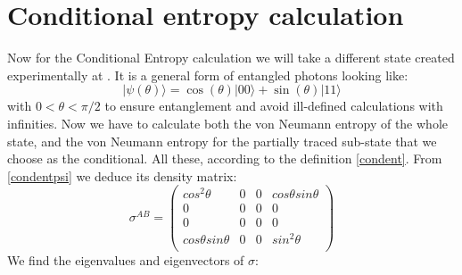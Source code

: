 \section{Conditional entropy calculation}
Now for the Conditional Entropy calculation we will take a different state created experimentally at \cite{gomez2019experimental}. It is a general form of entangled photons looking like:
\begin{equation}
|\psi(\theta)\rangle=\cos (\theta)|00\rangle+\sin (\theta)|11\rangle
\label{condentpsi}
\end{equation}
with $0< \theta< \pi /2$ to ensure entanglement and avoid ill-defined calculations with infinities.
Now we have to calculate both the von Neumann entropy of the whole state, and the von Neumann entropy for the partially traced sub-state that we choose as the conditional. All these, according to the definition \ref{condent}.
From \ref{condentpsi} we deduce its density matrix:
\begin{equation}
\sigma^{AB}=\left(
\begin{array}{cccc}
 cos ^2 \theta & 0 & 0 & cos \theta sin \theta \\
 0 & 0 & 0 & 0 \\
 0 & 0 & 0 & 0 \\
 cos \theta sin \theta & 0 & 0 & sin ^2 \theta  \\
\end{array}
\right)
\end{equation}
We find the eigenvalues and eigenvectors of $\sigma$:

